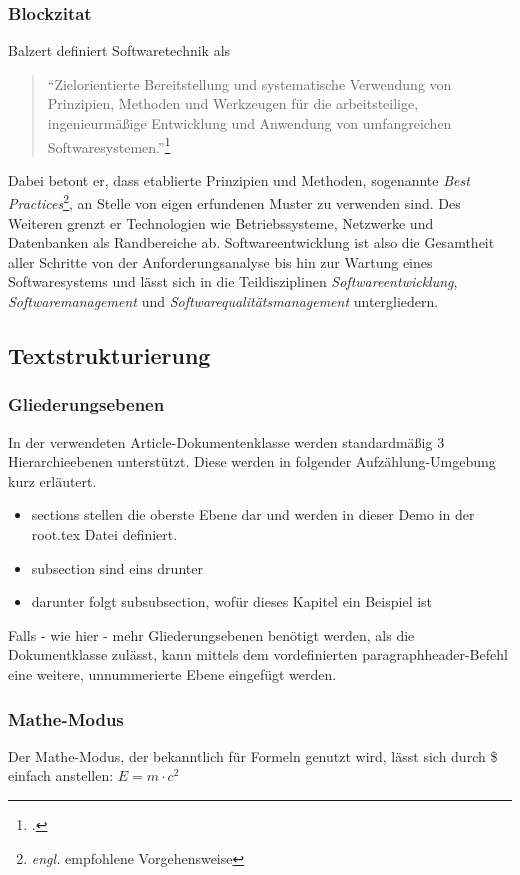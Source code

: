   \subsubsection{Blockzitat}
    Balzert definiert Softwaretechnik als
    \begin{quotation}
      "`Zielorientierte Bereitstellung und systematische Verwendung von Prinzipien, Methoden und Werkzeugen 
      für die arbeitsteilige, ingenieurmäßige Entwicklung und Anwendung von umfangreichen Softwaresystemen."'\footcite[S. 17]{balzert2010lehrbuch}    
    \end{quotation}
    Dabei betont er, dass etablierte Prinzipien und Methoden, sogenannte 
    \emph{Best Practices}\footnote{\emph{engl.} empfohlene Vorgehensweise},
    an Stelle von eigen erfundenen Muster zu verwenden sind.
    Des Weiteren grenzt er Technologien wie Betriebssysteme, Netzwerke und Datenbanken als Randbereiche ab. 
    Softwareentwicklung ist also die Gesamtheit aller Schritte von der Anforderungsanalyse bis hin zur Wartung eines Softwaresystems
    und lässt sich in die Teildisziplinen \emph{Softwareentwicklung}, \emph{Softwaremanagement} und \emph{Softwarequalitätsmanagement} untergliedern.

\subsection{Textstrukturierung}
  \subsubsection{Gliederungsebenen}
    In der verwendeten Article-Dokumentenklasse werden standardmäßig 3 Hierarchieebenen unterstützt.
    Diese werden in folgender Aufzählung-Umgebung kurz erläutert.
    
    \begin{itemize}
      \item sections stellen die oberste Ebene dar und werden in dieser Demo in der root.tex Datei definiert.
      \item subsection sind eins drunter
      \item darunter folgt subsubsection, wofür dieses Kapitel ein Beispiel ist 
    \end{itemize}

    Falls - wie hier - mehr Gliederungsebenen benötigt werden, als die Dokumentklasse zulässt, 
    kann mittels dem vordefinierten paragraphheader-Befehl eine weitere, unnummerierte Ebene eingefügt werden.
   
  \subsubsection{Mathe-Modus}
    Der Mathe-Modus, der bekanntlich für Formeln genutzt wird, lässt sich durch \$ einfach anstellen:
    $E = m \cdot c^2$